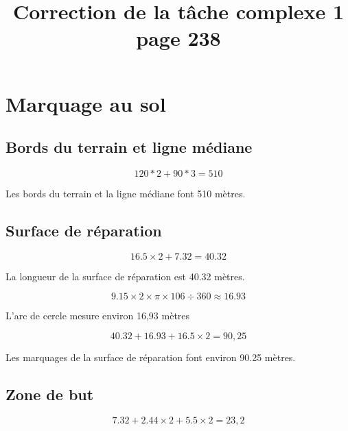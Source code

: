 \documentclass[12pt,a4paper]{article}
\title{Correction de la tâche complexe 1 page 238}
\date{}
\begin{document}
	
\maketitle


\section{Marquage au sol}


\subsection*{Bords du terrain et ligne médiane}

\begin{equation*}
	120 * 2 + 90 * 3 = 510
\end{equation*}

Les bords du terrain et la ligne médiane font 510 mètres.


\subsection*{Surface de réparation}

\begin{equation*}
	\num{16.5} \times 2 + 7.32 = \num{40.32}
\end{equation*}

La longueur de la surface de réparation est \num{40.32} mètres.

\begin{equation*}
	\num{9.15} \times 2 \times \pi \times 106 \div 360 \approx \num{16.93}
\end{equation*}

L'arc de cercle mesure environ 16,93 mètres

\begin{equation*}
	\num{40.32} + \num{16.93} + 16.5\times 2 = 90,25	
\end{equation*}

Les marquages de la surface de réparation font environ \num{90,25} mètres.

\subsection*{Zone de but}

\begin{equation*}
\num{7.32} + \num{2.44} \times 2 + \num{5.5} \times 2= 23,2	
\end{equation*}
\end{document}
